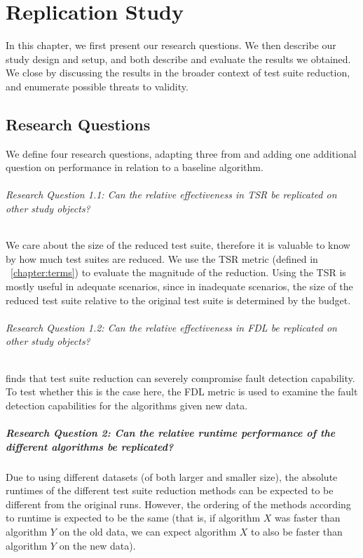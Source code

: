 
\chapter{Replication Study}\label{chapter:replication_study}

In this chapter, we first present our research questions. We then describe
our study design and setup, and both describe and evaluate the results
we obtained. We close by discussing the results in the broader context
of test suite reduction, and enumerate possible threats to validity.

\section{Research Questions}

We define four research questions, adapting three from
\cite{cruciani2019scalable} and adding one additional question on
performance in relation to a baseline algorithm.

\subparagraph{Research Question 1.1: Can the relative effectiveness in TSR be replicated on other study objects?}

We care about the size of the reduced test suite, therefore it is
valuable to know by how much test suites are reduced. We use the TSR
metric (defined in ~\ref{chapter:terms}) to evaluate the magnitude of
the reduction.  Using the TSR is mostly useful in adequate scenarios,
since in inadequate scenarios, the size of the reduced test suite relative
to the original test suite is determined by the budget.

\subparagraph{Research Question 1.2: Can the relative effectiveness in FDL be replicated on other study objects?}

\cite{rothermel2002empirical} finds that test suite reduction can severely
compromise fault detection capability. To test whether this is the case
here, the FDL metric is used to examine the fault detection capabilities
for the algorithms given new data.

\paragraph{Research Question 2: Can the relative runtime performance of the different algorithms be replicated?}

Due to using different datasets (of both larger and smaller size), the
absolute runtimes of the different test suite reduction methods can be
expected to be different from the original runs. However, the ordering of
the methods according to runtime is expected to be the same (that is, if
algorithm $X$ was faster than algorithm $Y$ on the old data, we can expect
algorithm $X$ to also be faster than algorithm $Y$ on the new data).

